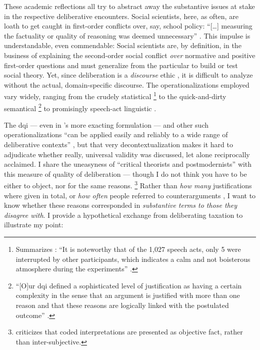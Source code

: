 These academic reflections all try to abstract away the substantive issues at stake in the respective deliberative encounters.
Social scientists, here, as often, are loath to get caught in first-order conflicts over, say, school policy:
``[\ldots] measuring the factuality or quality of reasoning was deemed unnecessary'' \cite[10]{Stromer-Galley2007}.
This impulse is understandable, even commendable:
Social scientists are, by definition, in the business of explaining the second-order social conflict \emph{over} normative and positive first-order questions \citep[compare][12]{GutmannThompson-2004-aa} and must generalize from the particular to build or test social theory.
Yet, since deliberation is a \emph{discourse} ethic \citep[153]{GutmannThompson-2002-aa}, it is difficult to analyze without the actual, domain-specific discourse.
The operationalizations employed vary widely, ranging from the crudely statistical \citep{Steiner2012}
\footnote{
	Summarizes \citeauthor{Steiner2012}:
	``It is noteworthy that of the 1,027 speech acts, only 5 were interrupted by other participants, which indicates a calm and not boisterous atmosphere during the experiments'' \citeyearpar[47]{Steiner2012}.
	}
to the quick-and-dirty semantical \citep{Steiner2012}
\footnote{
	``[O]ur \gls{dqi} defined a sophisticated level of justification as having a certain complexity in the sense that an argument is justified with more than one reason and that these reasons are logically linked with the postulated outcome'' \cite[64]{Steiner2012}.
}
to promisingly speech-act linguistic \citep{Landwehr2010}.

The \gls{dqi} --- even in \citeauthor{Steenbergen2003}'s more exacting formulation --- and other such operationalizations ``can be applied easily and reliably to a wide range of deliberative contexts'' \citep[22]{Steenbergen2003}, but that very decontextualization makes it hard to adjudicate whether really, universal validity was discussed, let alone reciprocally acclaimed.
I share the uneasyness of ``critical theorists and postmodernists'' \cite[11]{Steiner2012} with this measure of quality of deliberation --- though I do not think you have to be either to object, nor for the same reasons.
\footnote{
	\cite{King2009} criticizes that coded interpretations are presented as objective fact, rather than inter-subjective.
}
Rather than \emph{how many} justifications where given in total, or \emph{how often} people referred to counterarguments \cite[29]{Steenbergen2003}, I want to know whether these reasons corresponded in \emph{substantive terms to those they disagree with}.
I provide a hypothetical exchange from deliberating taxation to illustrate my point:

